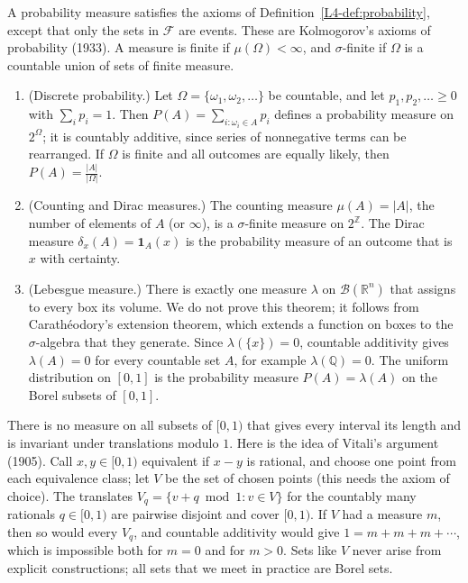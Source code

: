 A probability measure satisfies the axioms of Definition~\ref{L4-def:probability}, except that only the sets in $\mathcal{F}$ are events. These are Kolmogorov's axioms of probability (1933). A measure is finite if $\mu(\Omega) < \infty$, and $\sigma$-finite if $\Omega$ is a countable union of sets of finite measure.

\begin{example}[Measures]\label{B-ex:measures}
    \begin{enumerate}
        \item (Discrete probability.) Let $\Omega = \{\omega_1, \omega_2, \ldots\}$ be countable, and let $p_1, p_2, \ldots \geq 0$ with $\sum_i p_i = 1$. Then $P(A) = \sum_{i : \omega_i \in A} p_i$ defines a probability measure on $2^\Omega$; it is countably additive, since series of nonnegative terms can be rearranged. If $\Omega$ is finite and all outcomes are equally likely, then $P(A) = \frac{|A|}{|\Omega|}$.
        \item (Counting and Dirac measures.) The counting measure $\mu(A) = |A|$, the number of elements of $A$ (or $\infty$), is a $\sigma$-finite measure on $2^{\mathbb{Z}}$. The Dirac measure $\delta_x(A) = \mathbf{1}_A(x)$ is the probability measure of an outcome that is $x$ with certainty.
        \item (Lebesgue measure.) There is exactly one measure $\lambda$ on $\mathcal{B}(\mathbb{R}^n)$ that assigns to every box its volume. We do not prove this theorem; it follows from Carath\'eodory's extension theorem, which extends a function on boxes to the $\sigma$-algebra that they generate. Since $\lambda(\{x\}) = 0$, countable additivity gives $\lambda(A) = 0$ for every countable set $A$, for example $\lambda(\mathbb{Q}) = 0$. The uniform distribution on $[0, 1]$ is the probability measure $P(A) = \lambda(A)$ on the Borel subsets of $[0, 1]$.
    \end{enumerate}
\end{example}

\begin{remark}\label{B-rem:vitali}
    There is no measure on all subsets of $[0, 1)$ that gives every interval its length and is invariant under translations modulo $1$. Here is the idea of Vitali's argument (1905). Call $x, y \in [0, 1)$ equivalent if $x - y$ is rational, and choose one point from each equivalence class; let $V$ be the set of chosen points (this needs the axiom of choice). The translates $V_q = \{v + q \bmod 1 : v \in V\}$ for the countably many rationals $q \in [0, 1)$ are pairwise disjoint and cover $[0, 1)$. If $V$ had a measure $m$, then so would every $V_q$, and countable additivity would give $1 = m + m + m + \cdots$, which is impossible both for $m = 0$ and for $m > 0$. Sets like $V$ never arise from explicit constructions; all sets that we meet in practice are Borel sets.
\end{remark}

